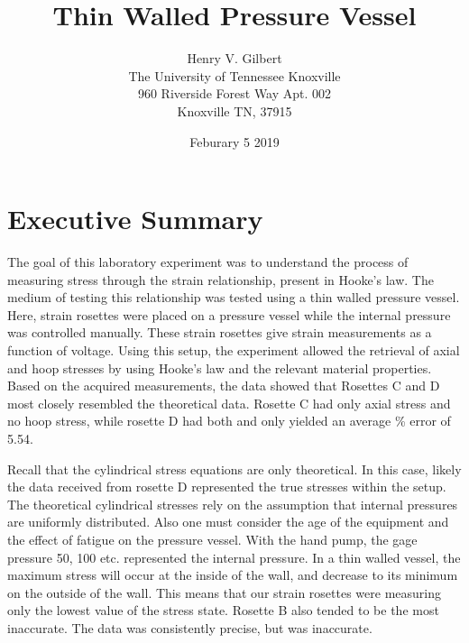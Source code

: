 \documentclass{article}
\title{Thin Walled Pressure Vessel}
\author{Henry V. Gilbert \\
	The University of Tennessee Knoxville \\
	960 Riverside Forest Way
	Apt. 002 \\
	Knoxville TN, 37915
	}
\date {Feburary 5 2019}
\begin{document}
\maketitle
\newpage


\section* {Executive Summary}
The goal of this laboratory experiment was to understand the process of measuring stress through the
strain relationship, present in Hooke's law. The medium of testing this relationship was tested using a
thin walled pressure vessel. Here, strain rosettes were placed on a pressure vessel while the internal
pressure was controlled manually. These strain rosettes give strain measurements as a function of
voltage. Using this setup, the experiment allowed the retrieval of axial and hoop stresses by using
Hooke's law and the relevant material properties. \\


Based on the acquired measurements, the data showed that Rosettes C and D most closely
resembled the theoretical data. Rosette C had only axial stress and no hoop stress, while rosette D had
both and only yielded an average \% error of 5.54. 


Recall that the cylindrical stress equations are only theoretical. In this case, likely the data received
from rosette D represented the true stresses within the setup. The theoretical cylindrical stresses rely
on the assumption that internal pressures are uniformly distributed. Also one must consider
the age of the equipment and the effect of fatigue on the pressure vessel. With the hand pump, the
gage pressure 50, 100 etc. represented the internal pressure. In a thin walled vessel, the maximum stress
will occur at the inside of the wall, and decrease to its minimum on the outside of the wall. This means
that our strain rosettes were measuring only the lowest value of the stress state. Rosette B also tended
to be the most inaccurate. The data was consistently precise, but was inaccurate. 

\newpage 



\end{document}
